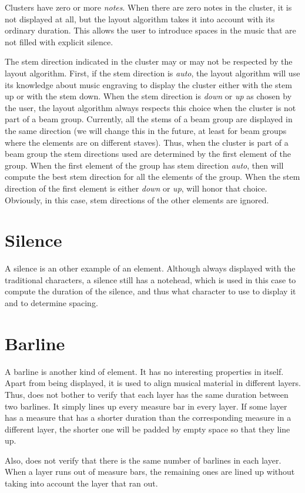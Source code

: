 Clusters have zero or more \emph{notes}.  When there are zero notes in
the cluster, it is not displayed at all, but the layout algorithm
takes it into account with its ordinary duration.  This allows the
user to introduce spaces in the music that are not filled with
explicit silence. 

The stem direction indicated in the cluster may or may not be
respected by the layout algorithm.  First, if the stem direction is
\emph{auto}, the layout algorithm will use its knowledge about music
engraving to display the cluster either with the stem up or with the
stem down.  When the stem direction is \emph{down} or \emph{up} as
chosen by the user, the layout algorithm always respects this choice
when the cluster is not part of a beam group.  Currently, all the
stems of a beam group are displayed in the same direction (we will
change this in the future, at least for beam groups where the elements
are on different staves).  Thus, when the cluster is part of a beam
group the stem directions used are determined by the first element of
the group.  When the first element of the group has stem direction
\emph{auto}, then \sysname{} will compute the best stem direction for all
the elements of the group.  When the stem direction of the first
element is either \emph{down} or \emph{up}, \sysname{} will honor that
choice.  Obviously, in this case, stem directions of the other
elements are ignored. 

\section{Silence}

A silence is an other example of an element.  Although always
displayed with the traditional characters, a silence still has a
notehead, which is used in this case to compute the duration of the
silence, and thus what character to use to display it and to determine
spacing. 

\section{Barline}

A barline is another kind of element.  It has no interesting
properties in itself.  Apart from being displayed, it is used to align
musical material in different layers.  Thus, \sysname{} does not bother to
verify that each layer has the same duration between two barlines.
It simply lines up every measure bar in every layer.  If some
layer has a measure that has a shorter duration than the corresponding
measure in a different layer, the shorter one will be padded by empty
space so that they line up. 

Also, \sysname{} does not verify that there is the same number of barlines
in each layer.  When a layer runs out of measure bars, the remaining
ones are lined up without taking into account the layer that ran out.
